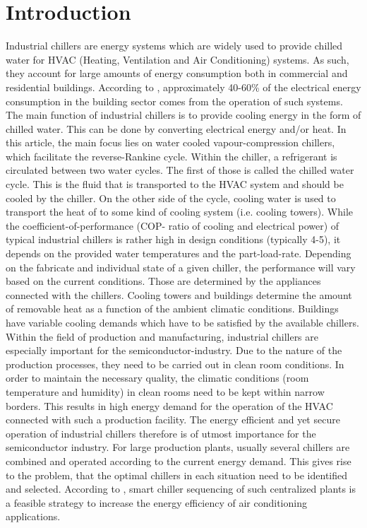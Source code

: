 \documentclass[3p,times,procedia,twocolumn,twoside]{elsarticle}
\begin{document}
\section{Introduction}
\label{main}
Industrial chillers are energy systems which are widely used to provide chilled water for HVAC (Heating, Ventilation and Air Conditioning) systems. As such, they account for large amounts of energy consumption both in commercial and residential buildings. According to \cite{Thangavelu2017}, approximately 40-60\% of the electrical energy consumption in the building sector comes from the operation of such systems.\\
The main function of industrial chillers is to provide cooling energy in the form of chilled water. This can be done by converting electrical energy and/or heat. In this article, the main focus lies on water cooled vapour-compression chillers, which facilitate the reverse-Rankine cycle. Within the chiller, a refrigerant is circulated between two water cycles.  The first of those is called the chilled water cycle. This is the fluid that is transported to the HVAC system and should be cooled by the chiller. On the other side of the cycle, cooling water is used to transport the heat of to some kind of cooling system (i.e. cooling towers). While the coefficient-of-performance (COP- ratio of cooling and electrical power) of typical industrial chillers is rather high in design conditions (typically 4-5), it depends on the provided water temperatures and the part-load-rate. Depending on the fabricate and individual state of a given chiller, the performance will vary based on the current conditions. Those are determined by the appliances connected with the chillers. Cooling towers and buildings determine the amount of removable heat as a function of the ambient climatic conditions. Buildings have variable cooling demands which have to be satisfied by the available chillers.\\
Within the field of production and manufacturing, industrial chillers are especially important for the semiconductor-industry. Due to the nature of the production processes, they need to be carried out in clean room conditions. In order to maintain the necessary quality, the climatic conditions (room temperature and humidity) in clean rooms need to be kept within narrow borders. This results in high energy demand for the operation of the HVAC connected with such a production facility. The energy efficient and yet secure operation of industrial chillers therefore is of utmost importance for the semiconductor industry. For large production plants, usually several chillers are combined and operated according to the current energy demand. This gives rise to the problem, that the optimal chillers in each situation need to be identified and selected. According to \cite{Chua2013}, smart chiller sequencing of such centralized plants is a feasible strategy to increase the energy efficiency of air conditioning applications.\\
\end{document}
